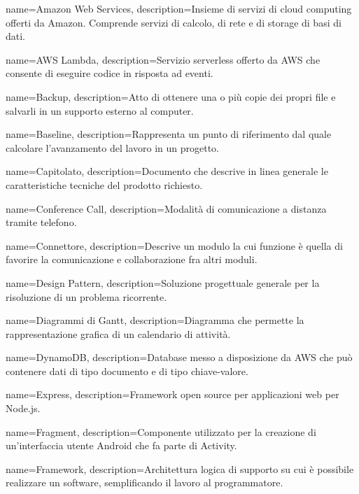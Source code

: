 {
name={Amazon Web Services},
description={Insieme di servizi di cloud computing offerti da Amazon. Comprende servizi di calcolo, di rete e di storage di basi di dati.}
}

{
	name={AWS Lambda},
	description={Servizio serverless offerto da AWS che consente di eseguire codice in risposta ad eventi.}
}

{
name={Backup},
description={Atto di ottenere una o più copie dei propri file e salvarli in un supporto esterno al computer.}
}

{
name={Baseline},
description={Rappresenta un punto di riferimento dal quale calcolare l’avanzamento del lavoro in un progetto.}
}

{
name={Capitolato},
description={Documento che descrive in linea generale le caratteristiche tecniche del prodotto richiesto.}
}

{
name={Conference Call},
description={Modalità di comunicazione a distanza tramite telefono.}
}

{
name={Connettore},
description={Descrive un modulo la cui funzione è quella di favorire la comunicazione e collaborazione fra altri moduli.}
}

{
name={Design Pattern},
description={Soluzione progettuale generale per la risoluzione di un problema ricorrente.}
}

{
name={Diagrammi di Gantt},
description={Diagramma che permette la rappresentazione grafica di un calendario di attività.}
}

{
name={DynamoDB},
description={Database messo a disposizione da AWS che può contenere dati di tipo documento e di tipo chiave-valore.}
}

{
	name={Express},
	description={Framework open source per applicazioni web per Node.js.}
}

{
	name={Fragment},
	description={Componente utilizzato per la creazione di un'interfaccia utente Android che fa parte di Activity.}
}

{
name={Framework},
description={Architettura logica di supporto su cui è possibile realizzare un software, semplificando il lavoro al programmatore.}
}

